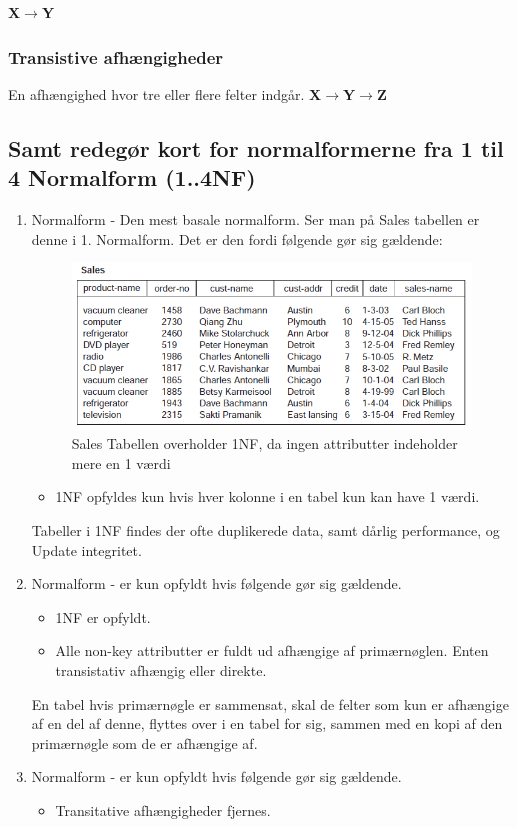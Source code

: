 \textbf{X$\rightarrow$Y}
\subsubsection{Transistive afhængigheder}
En afhængighed hvor tre eller flere felter indgår.
\textbf{X$\rightarrow$Y$\rightarrow$Z}
\subsection{Samt redegør kort for normalformerne fra 1 til 4 Normalform (1..4NF)}

\begin{enumerate}
	\item Normalform - Den mest basale normalform. Ser man på Sales tabellen er denne i 1. Normalform. Det er den fordi følgende gør sig gældende:
		\begin{figure}
			\centering
			\includegraphics[width=0.7\linewidth]{figs/spm5/notNormalizedTable.PNG}
			\caption{Sales Tabellen overholder 1NF, da ingen attributter indeholder mere en 1 værdi}
			\label{fig:notNormalizedTable}
		\end{figure}
	\begin{itemize}
		\item 1NF opfyldes kun hvis hver kolonne i en tabel kun kan have 1 værdi.
	\end{itemize}
	Tabeller i 1NF findes der ofte duplikerede data, samt dårlig performance, og Update integritet.
	
	\item Normalform - er kun opfyldt hvis følgende gør sig gældende.
	\begin{itemize}
		\item 1NF er opfyldt.
		\item Alle non-key attributter er fuldt ud afhængige af primærnøglen. Enten transistativ afhængig eller direkte.
	\end{itemize}
	En tabel hvis primærnøgle er sammensat, skal de felter som kun er afhængige af en del af denne, flyttes over i en tabel for sig, sammen med en kopi af den primærnøgle som de er afhængige af.
	
	\item Normalform - er kun opfyldt hvis følgende gør sig gældende.
	\begin{itemize}
		\item Transitative afhængigheder fjernes.
	\end{itemize}

\end{enumerate}
